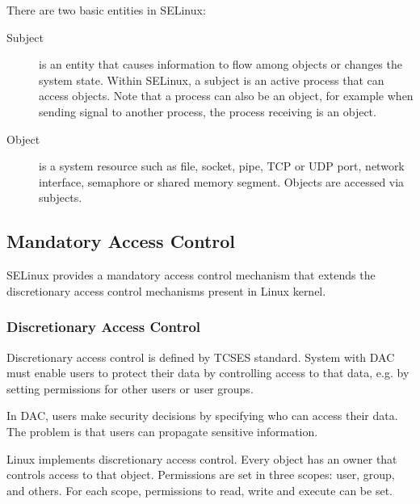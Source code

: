 There are two basic entities in SELinux:
\begin{description}
    \item [Subject] is an entity that causes information to flow among objects
        or changes the system state. Within SELinux, a subject is an active
        process that can access objects. Note that a process can also be an
        object, for example when sending signal to another process, the
        process receiving is an object.
    \item [Object] is a system resource such as file, socket, pipe, TCP or UDP
        port, network interface, semaphore or shared memory segment.  Objects
        are accessed via subjects.
\end{description}

\subsection{Mandatory Access Control}

SELinux provides a mandatory access control mechanism that extends the
discretionary access control mechanisms present in Linux kernel.

\subsubsection{Discretionary Access Control}
Discretionary access control is defined by TCSES standard. System with DAC must
enable users to protect their data by controlling access to that data, e.g. by
setting permissions for other users or user groups.

In DAC, users make security decisions by specifying who can access their data.
The problem is that users can propagate sensitive information.

Linux implements discretionary access control. Every object has an owner that
controls access to that object. Permissions are set in three scopes: user,
group, and others. For each scope, permissions to read, write and execute can be
set.

